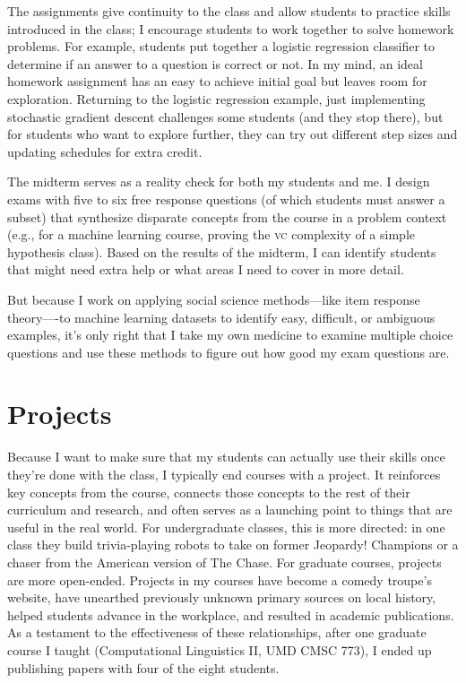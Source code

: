 \documentclass[11pt]{amsart}
\newcommand{\abr}[1]{\textsc{#1}}
\begin{document}
The assignments give continuity to the class and allow students to
practice skills introduced in the class; I encourage students to work
together to solve homework problems.
%
For example, students put together a logistic regression classifier to determine if an answer to a question is correct or not.  In my mind, an ideal homework assignment has an easy to achieve initial goal but leaves room for exploration.  Returning to the logistic regression example, just implementing stochastic gradient descent challenges some students (and they stop there), but for students who want to explore further, they can try out different step sizes and updating schedules for extra credit.

The midterm serves as a reality check for both my students and me.  I design exams with five to six free response questions (of which students must answer a subset) that synthesize disparate concepts from the course in a problem context (e.g., for a machine learning course, proving the \abr{vc} complexity of a simple hypothesis class).  Based on the results of the midterm, I can identify students that might need extra help or what areas I need to cover in more detail.

But because I work on applying social science methods—like item response theory—-to machine learning datasets to identify easy, difficult, or ambiguous examples, it’s only right that I take my own medicine to examine multiple choice questions and use these methods to figure out how good my exam questions are.

\section{Projects}

Because I want to make sure that my students can actually use their skills once they’re done with the class, I typically end courses with a project.  It reinforces key concepts from the
course, connects those concepts to the rest of their curriculum and research, and often serves as a launching point to things that are useful in the real world.  For undergraduate classes, this is more directed: in one class they build trivia-playing robots to take on former Jeopardy! Champions or a chaser from the American version of The Chase.  For graduate courses, projects are more open-ended.  Projects in my courses have become a comedy troupe's website, have unearthed previously unknown primary sources on local history, helped students advance in the workplace, and resulted in academic publications.  As a testament to the effectiveness of these relationships, after one graduate course I taught (Computational Linguistics II, UMD CMSC 773), I ended up publishing papers with four of the eight students.
\end{document}
